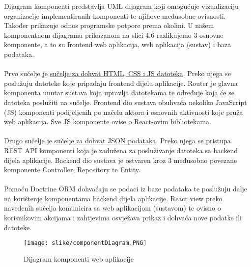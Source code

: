 			Dijagram komponenti predstavlja UML dijagram koji omogućuje vizualizaciju organizacije implementiranih komponenti te njihove međusobne ovisnosti. Također prikazuje odnos programske potpore prema okolini. U našem komponentnom dijagramu prikazanom na slici 4.6 razlikujemo 3 osnovne komponente, a to su frontend web aplikacija, web aplikacija (sustav) i baza podataka.\\ \\
			Prvo sučelje je \underline{sučelje za dohvat HTML, CSS i JS datoteka}. Preko njega se poslužuju datoteke koje pripadaju frontend dijelu aplikacije. Router je glavna komponenta unutar sustava koja upravlja datotekama te određuje koja će se datoteka poslužiti na sučelje. Frontend dio sustava obuhvaća nekoliko JavaScript (JS) komponenti podijeljenih po načelu aktora i osnovnih aktivnosti koje pruža web aplikacija. Sve JS komponente ovise o React-ovim bibliotekama. \\ \\
			Drugo sučelje je \underline{sučelje za dohvat JSON podataka}. Preko njega se pristupa REST API komponenti koja je zadužena za posluživanje datoteka sa backend dijela aplikacije. Backend dio sustava je ostvaren kroz 3 međusobno povezane komponente Controller, Repository te Entity. \\ \\
			Pomoću Doctrine ORM dohvaćaju se podaci iz baze podataka te poslužuju dalje na korištenje komponentama backend dijela aplikacije.  React view preko navedenih sučelja komunicira sa web aplikacijom (sustavom) te ovisno o korisnikovim akcijama i zahtjevima osvježava prikaz i dohvaća nove podatke ili datoteke.
			
			\begin{figure}[H]
				\texttt{[image: slike/componentDiagram.PNG]} %
				\centering
				\caption{Dijagram komponenti web aplikacije}
				\label{fig:promjene}
			\end{figure}